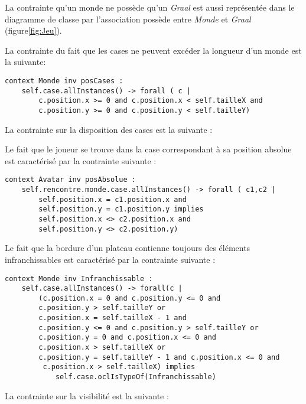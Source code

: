La contrainte qu'un monde ne possède qu'un \emph{Graal} est aussi représentée dans le diagramme de classe par l'association possède entre \emph{Monde} et \emph{Graal} (figure\ref{fig:Jeu}).

\vspace*{2cm}

La contrainte du fait que les cases ne peuvent excéder la longueur d'un monde est la suivante:

\begin{lstlisting}[caption=Contrainte sur la position des cases,captionpos=b,label={lst:casePos},language=OCL]
context Monde inv posCases :
	self.case.allInstances() -> forall ( c |
		c.position.x >= 0 and c.position.x < self.tailleX and
		c.position.y >= 0 and c.position.y < self.tailleY)
\end{lstlisting}

La contrainte  sur la disposition des cases est la suivante :


Le fait que le joueur se trouve dans la case correspondant à sa position absolue est caractérisé par la contrainte suivante :

\begin{lstlisting}[caption=Contrainte sur la position du joueur,captionpos=b,label={lst:posJoueur},language=OCL]
context Avatar inv posAbsolue :
	self.rencontre.monde.case.allInstances() -> forall ( c1,c2 |
		self.position.x = c1.position.x and 
		self.position.y = c1.position.y implies
		self.position.x <> c2.position.x and 
		self.position.y <> c2.position.y)
\end{lstlisting}

Le fait que la bordure d'un plateau contienne toujours des éléments infranchissables est caractérisé par la contrainte suivante :

\begin{lstlisting}[caption=Contrainte sur la bordure du plateau,captionpos=b,label={lst:bordurePlat},language=OCL]
context Monde inv Infranchissable :
	self.case.allInstances() -> forall(c |
		(c.position.x = 0 and c.position.y <= 0 and 
		c.position.y > self.tailleY or
		c.position.x = self.tailleX - 1 and 
		c.position.y <= 0 and c.position.y > self.tailleY or
		c.position.y = 0 and c.position.x <= 0 and 
		c.position.x > self.tailleX or
		c.position.y = self.tailleY - 1 and c.position.x <= 0 and
		 c.position.x > self.tailleX) implies
			self.case.oclIsTypeOf(Infranchissable)
\end{lstlisting}

La contrainte sur la visibilité est la suivante :

